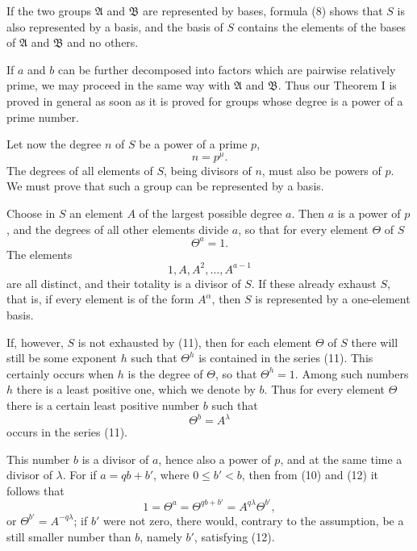 \documentclass[11pt]{article}
\begin{document}
If the two groups $\mathfrak A$ and $\mathfrak B$ are represented by bases, formula (8) shows that $S$ is also represented by a basis, and the basis of $S$ contains the elements of the bases of $\mathfrak A$ and $\mathfrak B$ and no others.

If $a$ and $b$ can be further decomposed into factors which are pairwise relatively prime, we may proceed in the same way with $\mathfrak A$ and $\mathfrak B$. Thus our Theorem I is proved in general as soon as it is proved for groups whose degree is a power of a prime number.

Let now the degree $n$ of $S$ be a power of a prime $p$,
\begin{equation}
n=p^\mu.
\tag{9}
\end{equation}
The degrees of all elements of $S$, being divisors of $n$, must also be powers of $p$. We must prove that such a group can be represented by a basis.

Choose in $S$ an element $A$ of the largest possible degree $a$. Then $a$ is a power of $p$, and the degrees of all other elements divide $a$, so that for every element $\Theta$ of $S$
\begin{equation}
\Theta^a=1.
\tag{10}
\end{equation}
The elements
\begin{equation}
1,A,A^2,\ldots,A^{a-1}
\tag{11}
\end{equation}
are all distinct, and their totality is a divisor of $S$. If these already exhaust $S$, that is, if every element is of the form $A^\alpha$, then $S$ is represented by a one-element basis.

If, however, $S$ is not exhausted by (11), then for each element $\Theta$ of $S$ there will still be some exponent $h$ such that $\Theta^h$ is contained in the series (11). This certainly occurs when $h$ is the degree of $\Theta$, so that $\Theta^h=1$. Among such numbers $h$ there is a least positive one, which we denote by $b$. Thus for every element $\Theta$ there is a certain least positive number $b$ such that
\begin{equation}
\Theta^b=A^\lambda
\tag{12}
\end{equation}
occurs in the series (11).

This number $b$ is a divisor of $a$, hence also a power of $p$, and at the same time a divisor of $\lambda$. For if $a=qb+b'$, where $0\le b'<b$, then from (10) and (12) it follows that
\[
1=\Theta^a=\Theta^{qb+b'}=A^{q\lambda}\Theta^{b'},
\]
or $\Theta^{b'}=A^{-q\lambda}$; if $b'$ were not zero, there would, contrary to the assumption, be a still smaller number than $b$, namely $b'$, satisfying (12).
\end{document}
